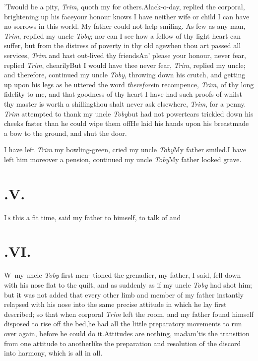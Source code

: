\documentclass{article}
\begin{document}
\tsk ’Twould be a pity, \textit{Trim}, quoth my
for others.\tsh Alack-o-day, replied the 
corporal, brightening up his face\tsk your
honour knows I have neither wife or child\break
\tsh I can have no sorrows in this world.\break
\tsk My father could not help smiling.\tsk{}
As few as any man, \textit{Trim}, replied my uncle
\textit{Toby}; nor can I see how a fellow of thy light heart
can suffer, but from the distress of poverty in thy old
age\tsk when thou art passed all services, \textit{Trim}\tsk
and hast out-lived thy friends\tsk An’ please your honour,
never fear, replied \textit{Trim}, chearily\tsk But I would
have thee never fear, \textit{Trim}, replied my uncle;
and therefore, continued my uncle
\textit{Toby}, throwing down his crutch, and getting up upon
his legs as he uttered the word \textit{therefore}\tsk in
recompence, \textit{Trim}, of thy long fidelity to me, and
that goodness of thy heart I have had such proofs of\tsk
whilst thy master is worth a shilling\tsk thou shalt never
ask elsewhere, \textit{Trim}, for a penny. \textit{Trim}
attempted to thank my uncle \textit{Toby}\tsk but had not
power\tsk tears trickled down his cheeks faster than he
could wipe them off\tsk He laid his hands upon
his breast\tsh made a bow to the ground, and shut the door.

\tsk I have left \textit{Trim} my bowling-green, cried my
uncle \textit{Toby}\tsk My father smiled.\break\tsk I
have left him moreover a pension, continued my uncle
\textit{Toby}\tsk My father looked grave.

\section{.\enspace V.}

\lettrine{I}{\,s} this a fit time, said my father to\break
himself, to talk of  and\break
{}

\section{.\enspace VI.}

\lettrine{W}{\,} my uncle \textit{Toby} first men-\break
tioned the grenadier, my father,\break
I said, fell down with his nose flat to the quilt, and as
suddenly as if my uncle
\textit{Toby} had shot him; but it was not added that every
other limb and member of my father instantly relapsed with
his nose into the same precise attitude in which he lay
first described; so that when corporal \textit{Trim} left
the room, and my father found himself disposed to rise off
the bed,\tsk he had all the little preparatory movements to
run over again, before he could do it.\tsk  Attitudes are
nothing, madam\tsk ’tis the transition from one attitude to
another\tsk like the preparation and resolution of the
discord into harmony, which is all in all.
\end{document}
